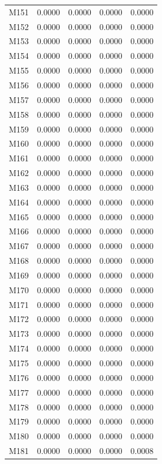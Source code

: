 \begin{longtable}{lrrrr}
M151 & 0.0000 & 0.0000 & 0.0000 & 0.0000 \\
M152 & 0.0000 & 0.0000 & 0.0000 & 0.0000 \\
M153 & 0.0000 & 0.0000 & 0.0000 & 0.0000 \\
M154 & 0.0000 & 0.0000 & 0.0000 & 0.0000 \\
M155 & 0.0000 & 0.0000 & 0.0000 & 0.0000 \\
M156 & 0.0000 & 0.0000 & 0.0000 & 0.0000 \\
M157 & 0.0000 & 0.0000 & 0.0000 & 0.0000 \\
M158 & 0.0000 & 0.0000 & 0.0000 & 0.0000 \\
M159 & 0.0000 & 0.0000 & 0.0000 & 0.0000 \\
M160 & 0.0000 & 0.0000 & 0.0000 & 0.0000 \\
M161 & 0.0000 & 0.0000 & 0.0000 & 0.0000 \\
M162 & 0.0000 & 0.0000 & 0.0000 & 0.0000 \\
M163 & 0.0000 & 0.0000 & 0.0000 & 0.0000 \\
M164 & 0.0000 & 0.0000 & 0.0000 & 0.0000 \\
M165 & 0.0000 & 0.0000 & 0.0000 & 0.0000 \\
M166 & 0.0000 & 0.0000 & 0.0000 & 0.0000 \\
M167 & 0.0000 & 0.0000 & 0.0000 & 0.0000 \\
M168 & 0.0000 & 0.0000 & 0.0000 & 0.0000 \\
M169 & 0.0000 & 0.0000 & 0.0000 & 0.0000 \\
M170 & 0.0000 & 0.0000 & 0.0000 & 0.0000 \\
M171 & 0.0000 & 0.0000 & 0.0000 & 0.0000 \\
M172 & 0.0000 & 0.0000 & 0.0000 & 0.0000 \\
M173 & 0.0000 & 0.0000 & 0.0000 & 0.0000 \\
M174 & 0.0000 & 0.0000 & 0.0000 & 0.0000 \\
M175 & 0.0000 & 0.0000 & 0.0000 & 0.0000 \\
M176 & 0.0000 & 0.0000 & 0.0000 & 0.0000 \\
M177 & 0.0000 & 0.0000 & 0.0000 & 0.0000 \\
M178 & 0.0000 & 0.0000 & 0.0000 & 0.0000 \\
M179 & 0.0000 & 0.0000 & 0.0000 & 0.0000 \\
M180 & 0.0000 & 0.0000 & 0.0000 & 0.0000 \\
M181 & 0.0000 & 0.0000 & 0.0000 & 0.0008 \\

\end{longtable}
